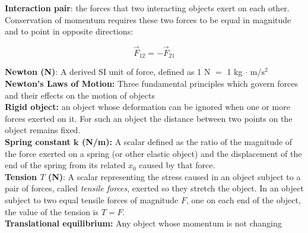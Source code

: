         \textbf{Interaction pair}: the forces that two interacting objects exert on each other. Conservation of momentum requires these two forces to be equal in magnitude and to point in opposite directions:

        \[
            \vec{F}_{12} = - \vec{F}_{21}
        \]

        \textbf{Newton (N)}: A derived SI unit of force, defined as 1 N $=$ 1 kg $\cdot$ m/$\text{s}^2$ \\
        \textbf{Newton's Laws of Motion:} Three fundamental principles which govern forces and their effects on the motion of objects \\
        \textbf{Rigid object:} an object whose deformation can be ignored when one or more forces exerted on it. For such an object the distance between two points on the object remains fixed. \\
        \textbf{Spring constant $\bm{k}$ (N/m):} A scalar defined as the ratio of the magnitude of the force exerted on a spring (or other elastic object) and the displacement of the end of the spring from its related
        $x_0$ caused by that force. \\
        \textbf{Tension $T$ (N)}: A scalar representing the stress caused in an object subject to a pair of forces, called \textit{tensile forces}, exerted so they stretch the object. In an object subject to two equal
        tensile forces of magnitude $F$, one on each end of the object, the value of the tension is $T=F$. \\
        \textbf{Translational equilibrium:} Any object whose momentum is not changing



